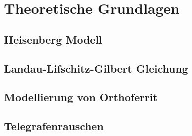 \documentclass[main.tex]{subfiles}
\begin{document}
\section{Theoretische Grundlagen}

\subsection{Heisenberg Modell}

\subsection{Landau-Lifschitz-Gilbert Gleichung}

\subsection{Modellierung von Orthoferrit}

\subsection{Telegrafenrauschen}
\end{document}
